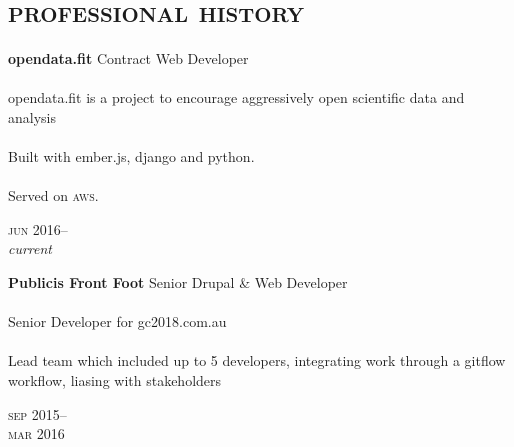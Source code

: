 
\vspace{-0.6cm}
\section*{\textsc{professional history}}
\vspace{-0.2cm}

\begin{minipage}[t]{0.70\textwidth}
\textbf{opendata.fit}\phantom{..} Contract Web Developer\\
\\
opendata.fit is a project to encourage aggressively open scientific data and 
analysis 
\\
\\
Built with ember.js, django and python. \\
\\
Served on \textsc{aws}. 
{\small
\textit{}
\par}
\end{minipage}
\begin{minipage}[t]{0.30\textwidth}
{
\hfill \textsc{jun} 2016--\\ 
\hspace*{0pt} \hfill \textit{current}
\par
}
\end{minipage}
\vspace{0.2in}


\begin{minipage}[t]{0.70\textwidth}
\textbf{Publicis Front Foot}\phantom{..} Senior Drupal \& Web Developer \\
\\
Senior Developer for gc2018.com.au
\\
\\
Lead team which included up to 5 developers, integrating work through a gitflow workflow, liasing with stakeholders
\\
{\small
\textit{}
\par}
\end{minipage}
\begin{minipage}[t]{0.30\textwidth}
{
\hfill \textsc{sep} 2015--\\ 
\hspace*{0pt} \hfill \textsc{mar} 2016
\par
}
\end{minipage}
\vspace{0.2in}


